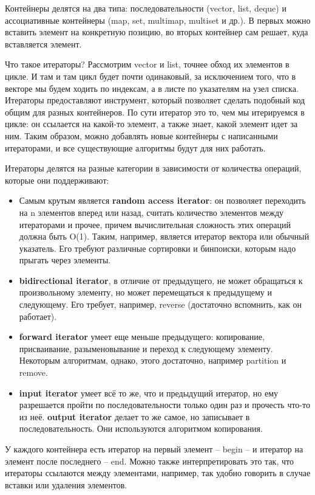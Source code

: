 \documentclass[12pt, a4paper]{article}
\begin{document}
	\par Контейнеры делятся на два типа: последовательности (vector, list, deque) и ассоциативные контейнеры (map, set, multimap, multiset и др.). В первых можно вставить элемент на конкретную позицию, во вторых контейнер сам решает, куда вставляется элемент.
	\par Что такое итераторы? Рассмотрим vector и list, точнее обход их элементов в цикле. И там и там цикл будет почти одинаковый, за исключением того, что в векторе мы будем ходить по индексам, а в листе по указателям на узел списка. Итераторы предоставляют инструмент, который позволяет сделать подобный код общим для разных контейнеров. По сути итератор это то, чем мы итерируемся в цикле: он ссылается на какой-то элемент, а также знает, какой элемент идет за ним. Таким образом, можно добавлять новые контейнеры с написанными итераторами, и все существующие алгоритмы будут для них работать.
	\par Итераторы делятся на разные категории в зависимости от количества операций, которые они поддерживают:
	\begin{itemize}
		\item Самым крутым является \textbf{random access iterator}: он позволяет переходить на n элементов вперед или назад, считать количество элементов между итераторами и прочее, причем вычислительная сложность этих операций должна быть O(1). Таким, например, является итератор вектора или обычный указатель. Его требуют различные сортировки и бинпоиски, которым надо прыгать через элементы.
		\item \textbf{bidirectional iterator}, в отличие от предыдущего, не может обращаться к произвольному элементу, но может перемещаться к предыдущему и следующему. Его требует, например, reverse (достаточно вспомнить, как он работает).
		\item \textbf{forward iterator} умеет еще меньше предыдущего: копирование, присваивание, разыменовывание и переход к следующему элементу. Некоторым алгоритмам, однако, этого достаточно, например partition и remove.
		\item \textbf{input iterator} умеет всё то же, что и предыдущий итератор, но ему разрешается пройти по последовательности только один раз и прочесть что-то из неё. \textbf{output iterator} делает то же самое, но записывает в последовательность. Они используются алгоритмом копирования.
	\end{itemize}
	\par У каждого контейнера есть итератор на первый элемент -- begin -- и итератор на элемент после последнего -- end. Можно также интерпретировать это так, что итераторы ссылаются между элементами, например, так удобно говорить в случае вставки или удаления элементов.
\end{document}
